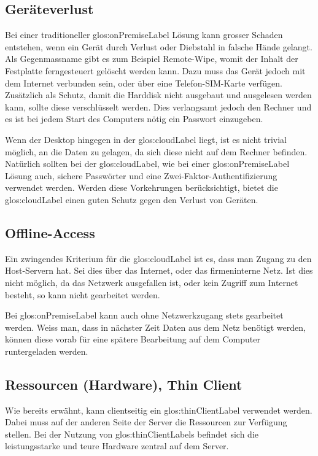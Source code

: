 \subsection{Geräteverlust}
Bei einer traditioneller \gls{glos:onPremiseLabel} Lösung kann grosser Schaden entstehen, wenn ein Gerät durch Verlust oder Diebstahl in falsche Hände gelangt.
Als Gegenmassname gibt es zum Beispiel Remote-Wipe, womit der Inhalt der Festplatte ferngesteuert gelöscht werden kann. Dazu muss das Gerät jedoch mit dem Internet verbunden sein, oder über eine Telefon-SIM-Karte verfügen.
Zusätzlich als Schutz, damit die Harddisk nicht ausgebaut und ausgelesen werden kann, sollte diese verschlüsselt werden. Dies verlangsamt jedoch den Rechner und es ist bei jedem Start des Computers nötig ein Passwort einzugeben.

Wenn der Desktop hingegen in der \Gls{glos:cloudLabel} liegt, ist es nicht trivial möglich, an die Daten zu gelagen, da sich diese nicht auf dem Rechner befinden.
Natürlich sollten bei der \Gls{glos:cloudLabel}, wie bei einer \gls{glos:onPremiseLabel} Lösung auch, sichere Passwörter und eine Zwei-Faktor-Authentifizierung verwendet werden. Werden diese Vorkehrungen berücksichtigt, bietet die \Gls{glos:cloudLabel} einen guten Schutz gegen den Verlust von Geräten.

\subsection{Offline-Access}
Ein zwingendes Kriterium für die \Gls{glos:cloudLabel} ist es, dass man Zugang zu den Host-Servern hat. Sei dies über das Internet, oder das firmeninterne Netz. Ist dies nicht möglich, da das Netzwerk ausgefallen ist, oder kein Zugriff zum Internet besteht, so kann nicht gearbeitet werden.

Bei \gls{glos:onPremiseLabel} kann auch ohne Netzwerkzugang stets gearbeitet werden. Weiss man, dass in nächster Zeit Daten aus dem Netz benötigt werden, können diese vorab für eine spätere Bearbeitung auf dem Computer runtergeladen werden.

\subsection{Ressourcen (Hardware), Thin Client}
Wie bereits erwähnt, kann clientseitig ein \gls{glos:thinClientLabel} verwendet werden. Dabei muss auf der anderen Seite der Server die Ressourcen zur Verfügung stellen.
Bei der Nutzung von \glspl{glos:thinClientLabel} befindet sich die leistungsstarke und teure Hardware zentral auf dem Server.

